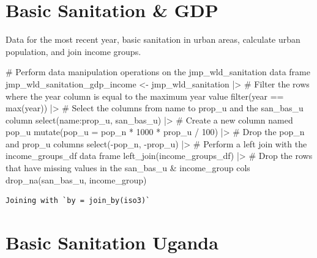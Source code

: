 \documentclass[
  letterpaper,
  DIV=11,
  numbers=noendperiod]{scrartcl}
\newenvironment{Shaded}{\begin{snugshade}}{\end{snugshade}}
\newcommand{\AttributeTok}[1]{\textcolor[rgb]{0.40,0.45,0.13}{#1}}
\newcommand{\CommentTok}[1]{\textcolor[rgb]{0.37,0.37,0.37}{#1}}
\newcommand{\DecValTok}[1]{\textcolor[rgb]{0.68,0.00,0.00}{#1}}
\newcommand{\FunctionTok}[1]{\textcolor[rgb]{0.28,0.35,0.67}{#1}}
\newcommand{\NormalTok}[1]{\textcolor[rgb]{0.00,0.23,0.31}{#1}}
\newcommand{\OtherTok}[1]{\textcolor[rgb]{0.00,0.23,0.31}{#1}}
\newcommand{\SpecialCharTok}[1]{\textcolor[rgb]{0.37,0.37,0.37}{#1}}
\begin{document}
\hypertarget{basic-sanitation-gdp}{%
\section{Basic Sanitation \& GDP}\label{basic-sanitation-gdp}}

Data for the most recent year, basic sanitation in urban areas,
calculate urban population, and join income groups.

\begin{Shaded}
\begin{Highlighting}[]
\CommentTok{\# Perform data manipulation operations on the jmp\_wld\_sanitation data frame}
\NormalTok{jmp\_wld\_sanitation\_gdp\_income }\OtherTok{\textless{}{-}}\NormalTok{ jmp\_wld\_sanitation }\SpecialCharTok{|\textgreater{}} 
  \CommentTok{\# Filter the rows where the year column is equal to the maximum year value}
  \FunctionTok{filter}\NormalTok{(year }\SpecialCharTok{==} \FunctionTok{max}\NormalTok{(year)) }\SpecialCharTok{|\textgreater{}} 
  \CommentTok{\# Select the columns from name to prop\_u and the san\_bas\_u column}
  \FunctionTok{select}\NormalTok{(name}\SpecialCharTok{:}\NormalTok{prop\_u, san\_bas\_u) }\SpecialCharTok{|\textgreater{}} 
  \CommentTok{\# Create a new column named pop\_u}
  \FunctionTok{mutate}\NormalTok{(}\AttributeTok{pop\_u =}\NormalTok{ pop\_n }\SpecialCharTok{*} \DecValTok{1000} \SpecialCharTok{*}\NormalTok{ prop\_u }\SpecialCharTok{/} \DecValTok{100}\NormalTok{) }\SpecialCharTok{|\textgreater{}} 
  \CommentTok{\# Drop the pop\_n and prop\_u columns}
  \FunctionTok{select}\NormalTok{(}\SpecialCharTok{{-}}\NormalTok{pop\_n, }\SpecialCharTok{{-}}\NormalTok{prop\_u) }\SpecialCharTok{|\textgreater{}} 
  \CommentTok{\# Perform a left join with the income\_groups\_df data frame}
  \FunctionTok{left\_join}\NormalTok{(income\_groups\_df) }\SpecialCharTok{|\textgreater{}} 
  \CommentTok{\# Drop the rows that have missing values in the san\_bas\_u \& income\_group cols}
  \FunctionTok{drop\_na}\NormalTok{(san\_bas\_u, income\_group)}
\end{Highlighting}
\end{Shaded}

\begin{verbatim}
Joining with `by = join_by(iso3)`
\end{verbatim}

\hypertarget{basic-sanitation-uganda}{%
\section{Basic Sanitation Uganda}\label{basic-sanitation-uganda}}
\end{document}
